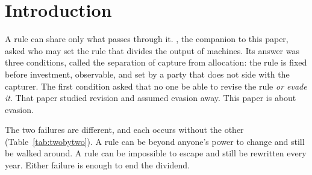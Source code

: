 \begin{abstract}
\noindent A rule that shares the output of machines pays only what it can collect. A
companion paper showed that a dividend on autonomous output requires a rule fixed in
advance, observable, and independent of the capturer, and assumed that the rule could not
be evaded. This paper drops that assumption: capturers can route output around the rule
at a cost. Four results follow. First, a rule collects at most what it costs to bypass,
so a separated rule over an easily bypassed base pays nothing. Second,
when capturers are identical it does not matter where along the production chain the rule
binds; only the bypass costs matter, and those of different points add up. Third, when
capturers differ in productivity, a levy on an essential input cannot track their rents,
and the best rule has two parts: a share of output up to its bypass cost, and a levy at
the bottleneck that makes up the shortfall at average productivity. Fourth, an unregulated
owner of the bottleneck charges exactly the levy that recipients would choose for
themselves, and keeps it. The rule has to bind at the bottleneck and be separated from
whoever owns it.

\medskip
\noindent\textbf{Keywords:} enforcement; evasion; bottleneck; compute; distribution;
artificial intelligence; transaction fees.

\noindent\textbf{JEL:} D23, H21, H26, L12, O33.
\end{abstract}

\section{Introduction}

A rule can share only what passes through it. \citet{TitanSeparation2026}, the companion
to this paper, asked who may set the rule that divides the output of machines. Its answer
was three conditions, called the separation of capture from allocation: the rule is fixed
before investment, observable, and set by a party that does not side with the capturer.
The first condition asked that no one be able to revise the rule \emph{or evade it}. That
paper studied revision and assumed evasion away. This paper is about evasion.

The two failures are different, and each occurs without the other
(Table~\ref{tab:twobytwo}). A rule can be beyond anyone's power to change and still be
walked around. A rule can be impossible to escape and still be rewritten every year.
Either failure is enough to end the dividend.

